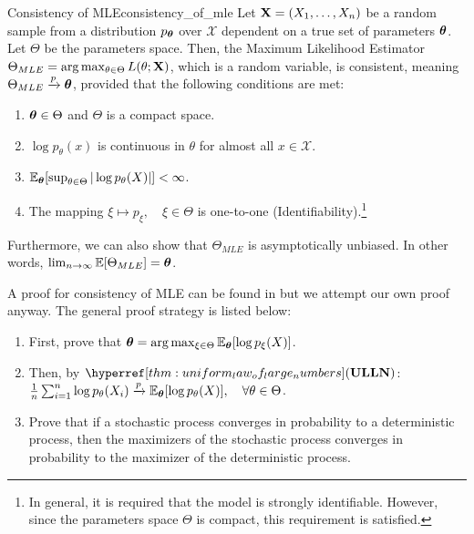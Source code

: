 \begin{proof*}
\begin{proposition}{Consistency of MLE}{consistency_of_mle}
    Let ${\bf X}=(X_1, \dots, X_n)$ be a random sample from a distribution $p_{\boldsymbol{\theta}}$ over $\mathcal{X}$ dependent on a true set of parameters $\boldsymbol{\theta}$. Let $\Theta$ be the parameters space. Then, the Maximum Likelihood Estimator $\Theta_{MLE} = \arg\max_{\theta\in\Theta}L(\theta;{\bf X})$, which is a random variable, is consistent, meaning $\Theta_{MLE}\xrightarrow{p}\boldsymbol{\theta}$, provided that the following conditions are met:
    \begin{enumerate}
        \item $\boldsymbol{\theta}\in\Theta$ and $\Theta$ is a compact space. 
        \item $\log p_\theta(x)$ is continuous in $\theta$ for almost all $x\in\mathcal{X}$.
        \item $\mathbb{E}_{\boldsymbol{\theta}}[\sup_{\theta\in\Theta}|\log p_\theta(X)|] < \infty$.
        \item The mapping $\xi\mapsto p_\xi, \quad \xi\in\Theta$ is one-to-one (Identifiability).\footnote{In general, it is required that the model is strongly identifiable. However, since the parameters space $\Theta$ is compact, this requirement is satisfied.}
    \end{enumerate} 
    
    \noindent Furthermore, we can also show that $\Theta_{MLE}$ is asymptotically unbiased. In other words, $\lim_{n\to\infty}\mathbb{E}[\Theta_{MLE}] = \boldsymbol{\theta}$.
\end{proposition} 

\begin{proof*}
    A proof for consistency of MLE can be found in \cite[Theorem 2.5]{book:newey1994} but we attempt our own proof anyway. The general proof strategy is listed below:
    \begin{enumerate}
        \item First, prove that $\boldsymbol{\theta}=\arg\max_{\xi\in\Theta}\mathbb{E}_{\boldsymbol{\theta}} [\log p_\xi(X)]$. 
        \item Then, by $\ULLN$: $\frac{1}{n}\sum_{i=1}^n \log p_\theta(X_i)\xrightarrow{p}\mathbb{E}_{\boldsymbol{\theta}}[\log p_\theta(X)], \quad \forall \theta\in\Theta$.
        \item Prove that if a stochastic process converges in probability to a deterministic process, then the maximizers of the stochastic process converges in probability to the maximizer of the deterministic process.
    \end{enumerate} 


\end{proof*}
\end{proof*}
